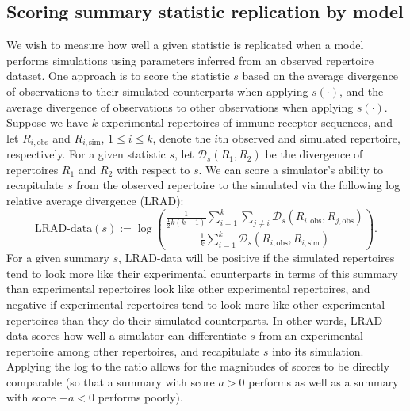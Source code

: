 \documentclass{article}
\begin{document}
\subsection*{Scoring summary statistic replication by model}
We wish to measure how well a given statistic is replicated when a model performs simulations using parameters inferred from an observed repertoire dataset.
One approach is to score the statistic $s$ based on the average divergence of observations to their simulated counterparts when applying $s(\cdot)$, and the average divergence of observations to other observations when applying $s(\cdot)$.
Suppose we have $k$ experimental repertoires of immune receptor sequences, and let $R_{i, \text{obs}}$ and $R_{i, \text{sim}}$, $1 \le i \le k$, denote the $i$th observed and simulated repertoire, respectively.
For a given statistic $s$, let $\mathcal D_s(R_1, R_2)$ be the divergence of repertoires $R_1$ and $R_2$ with respect to $s$.
We can score a simulator's ability to recapitulate $s$ from the observed repertoire to the simulated via the following log relative average divergence (LRAD):
\begin{equation}\label{eq:ScoreObs}
    \text{LRAD-data}(s) :=
    \log \left(
        \frac{
            \frac{1}{\frac{1}{2} k\left(k - 1\right)}
            \sum_{i=1}^{k}
            \sum_{j \ne i}
                \mathcal D_s\left(R_{i, \text{obs}}, R_{j, \text{obs}}\right)
        }
        {
            \frac{1}{k}
            \sum_{i = 1}^k
                \mathcal D_s \left( R_{i, \text{obs}}, R_{i, \text{sim}} \right)
        }
    \right).
\end{equation}
For a given summary $s$, LRAD-data will be positive if the simulated repertoires tend to look more like their experimental counterparts in terms of this summary than experimental repertoires look like other experimental repertoires, and negative if experimental repertoires tend to look more like other experimental repertoires than they do their simulated counterparts.
In other words, LRAD-data scores how well a simulator can differentiate $s$ from an experimental repertoire among other repertoires, and recapitulate $s$ into its simulation.
Applying the log to the ratio allows for the magnitudes of scores to be directly comparable (so that a summary with score $a > 0$ performs as well as a summary with score $-a < 0$ performs poorly).
\end{document}
